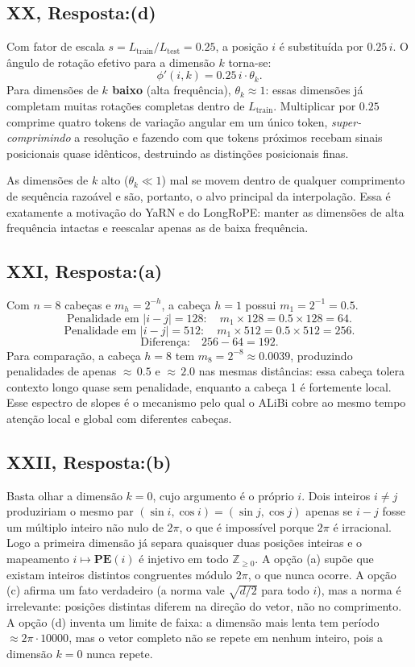 \documentclass{dlproblemset}
\begin{document}
\subsection*{XX, Resposta:(d)}
Com fator de escala $s = L_{\mathrm{train}}/L_{\mathrm{test}} = 0.25$, a posição
$i$ é substituída por $0.25\,i$. O ângulo de rotação efetivo para a dimensão $k$
torna-se:
\[
  \phi'(i,k) = 0.25\,i \cdot \theta_k.
\]
Para dimensões de \textbf{$k$ baixo} (alta frequência), $\theta_k \approx 1$:
essas dimensões já completam muitas rotações completas dentro de $L_{\mathrm{train}}$.
Multiplicar por $0.25$ comprime quatro tokens de variação angular em um único token,
\emph{super-comprimindo} a resolução e fazendo com que tokens próximos recebam sinais
posicionais quase idênticos, destruindo as distinções posicionais finas.

As dimensões de $k$ alto ($\theta_k \ll 1$) mal se movem dentro de qualquer comprimento
de sequência razoável e são, portanto, o alvo principal da interpolação. Essa é
exatamente a motivação do YaRN e do LongRoPE: manter as dimensões de alta frequência
intactas e reescalar apenas as de baixa frequência.

\subsection*{XXI, Resposta:(a)}
Com $n = 8$ cabeças e $m_h = 2^{-h}$, a cabeça $h = 1$ possui $m_1 = 2^{-1} = 0.5$.
\[
  \text{Penalidade em } |i-j| = 128:\quad m_1 \times 128 = 0.5 \times 128 = 64.
\]
\[
  \text{Penalidade em } |i-j| = 512:\quad m_1 \times 512 = 0.5 \times 512 = 256.
\]
\[
  \text{Diferença:}\quad 256 - 64 = 192.
\]
Para comparação, a cabeça $h = 8$ tem $m_8 = 2^{-8} \approx 0.0039$, produzindo
penalidades de apenas ${\approx}\,0.5$ e ${\approx}\,2.0$ nas mesmas distâncias:
essa cabeça tolera contexto longo quase sem penalidade, enquanto a cabeça 1 é
fortemente local. Esse espectro de slopes é o mecanismo pelo qual o ALiBi cobre
ao mesmo tempo atenção local e global com diferentes cabeças.

\subsection*{XXII, Resposta:(b)}
Basta olhar a dimensão $k = 0$, cujo argumento é o próprio $i$. Dois inteiros
$i \neq j$ produziriam o mesmo par $(\sin i, \cos i) = (\sin j, \cos j)$ apenas se
$i - j$ fosse um múltiplo inteiro não nulo de $2\pi$, o que é impossível porque
$2\pi$ é irracional. Logo a primeira dimensão já separa quaisquer duas posições
inteiras e o mapeamento $i \mapsto \mathbf{PE}(i)$ é injetivo em todo
$\mathbb{Z}_{\geq 0}$.
A opção (a) supõe que existam inteiros distintos congruentes módulo $2\pi$, o que
nunca ocorre.
A opção (c) afirma um fato verdadeiro (a norma vale $\sqrt{d/2}$ para todo $i$),
mas a norma é irrelevante: posições distintas diferem na direção do vetor, não no
comprimento.
A opção (d) inventa um limite de faixa: a dimensão mais lenta tem período
$\approx 2\pi \cdot 10000$, mas o vetor completo não se repete em nenhum inteiro,
pois a dimensão $k = 0$ nunca repete.
\end{document}

